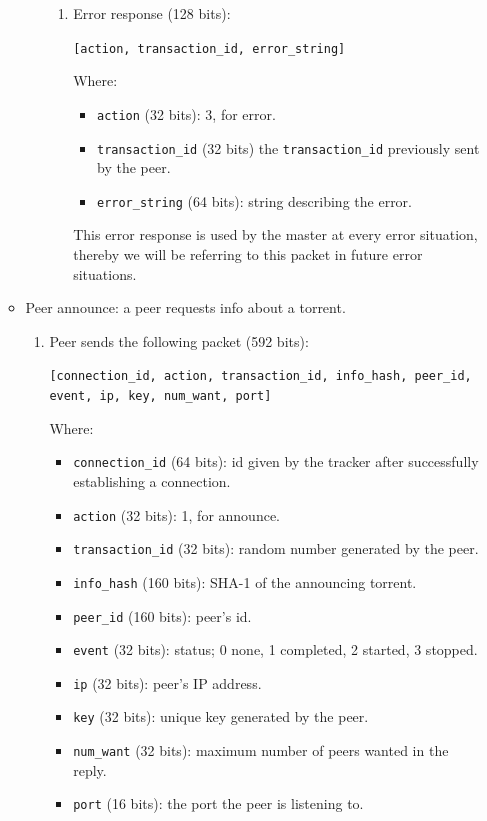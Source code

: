 \documentclass[twoside,a4paper,10pt]{article}
\begin{document}
\begin{itemize}
\begin{itemize}
\begin{enumerate}
\begin{enumerate}
      \item Error response (128 bits)\label{it:error-response}:
        
        \texttt{[action, transaction\_id, error\_string]} 

        Where:
        \begin{itemize}
        \item \texttt{action} (32 bits): 3, for error.
        \item \texttt{transaction\_id} (32 bits)
          the \texttt{transaction\_id} previously sent by the peer.
        \item \texttt{error\_string} (64 bits): string describing the error.
        \end{itemize}

        This error response is used by the master at every error situation,
        thereby we will be referring to this packet in future error situations.
        
      \end{enumerate}
    \end{enumerate}

  \item Peer announce: a peer requests info about a torrent.
    \begin{enumerate}
    \item Peer sends the following packet (592 bits):

      \texttt{[connection\_id, action, transaction\_id, info\_hash, peer\_id,
          event, ip, key, num\_want, port]}

      Where:
      \begin{itemize}
      \item \texttt{connection\_id} (64 bits): id given by the tracker after
        successfully establishing a connection.
      \item \texttt{action} (32 bits): 1, for announce.
      \item \texttt{transaction\_id} (32 bits): random number generated by the
        peer.
      \item \texttt{info\_hash} (160 bits): SHA-1 of the announcing torrent.
      \item \texttt{peer\_id} (160 bits): peer's id.
      \item \texttt{event} (32 bits): status; 0 none, 1 completed, 2 started,
        3 stopped.
      \item \texttt{ip} (32 bits): peer's IP address.
      \item \texttt{key} (32 bits): unique key generated by the peer.
      \item \texttt{num\_want} (32 bits): maximum number of peers wanted in the
        reply. %
      \item \texttt{port} (16 bits): the port the peer is listening to.
      \end{itemize}


\end{enumerate}
\end{itemize}
\end{itemize}
\end{document}
